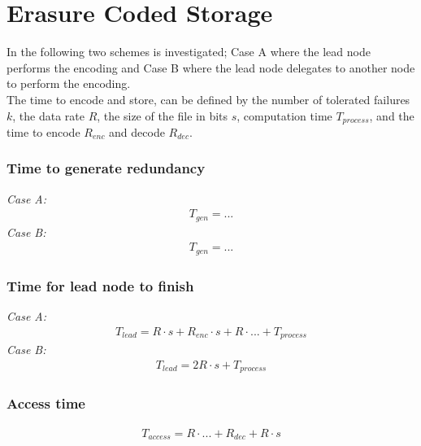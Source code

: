 \section{Erasure Coded Storage}
In the following two schemes is investigated; Case A where the lead node performs the encoding and Case B where the lead node delegates to another node to perform the encoding.\\
The time to encode and store, can be defined by the number of tolerated failures $k$, the data rate $R$, the size of the file in bits $s$, computation time $T_{process}$, and the time to encode $R_{enc}$ and decode $R_{dec}$.

\subsubsection*{Time to generate redundancy}
\textit{Case A:} 
\begin{align}
    T_{gen} = ...
\end{align}
\textit{Case B:} 
\begin{align}
    T_{gen} = ...
\end{align}

\subsubsection*{Time for lead node to finish}
\textit{Case A:} 
\begin{align}
    T_{lead} = R \cdot s + R_{enc} \cdot s + R \cdot ... + T_{process}
\end{align}
\textit{Case B:} 
\begin{align}
    T_{lead} = 2R \cdot s + T_{process}
\end{align}

\subsubsection*{Access time}
\begin{align}
    T_{access} = R \cdot ... + R_{dec} + R \cdot s
\end{align}

